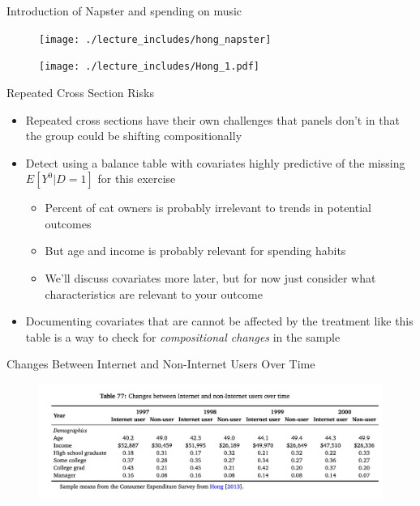 \documentclass{beamer}
\begin{document}
\begin{frame}{Introduction of Napster and spending on music}
	\begin{figure}
	\texttt{[image: ./lecture\_includes/hong\_napster]}
	\end{figure}
	
\end{frame}


\begin{frame}[plain]
	\begin{figure}
	\texttt{[image: ./lecture\_includes/Hong\_1.pdf]}
	\end{figure}
	
\end{frame}



\begin{frame}{Repeated Cross Section Risks}

\begin{itemize}
\item Repeated cross sections have their own challenges that panels don't in that the group could be shifting compositionally
\item Detect using a balance table with covariates highly predictive of the missing $E[Y^0|D=1]$ for this exercise 
	\begin{itemize}
	\item Percent of cat owners is probably irrelevant to trends in potential outcomes
	\item But age and income is probably relevant for spending habits
	\item We'll discuss covariates more later, but for now just consider what characteristics are relevant to your outcome
	\end{itemize}
\item Documenting covariates that are cannot be affected by the treatment like this table is a way to check for \emph{compositional changes} in the sample
\end{itemize}

\end{frame}


\begin{frame}{Changes Between Internet and Non-Internet Users Over Time}

	\begin{figure}
	\includegraphics[scale=0.5]{./lecture_includes/hong_table.png}
	\end{figure}



\end{frame}
\end{document}
